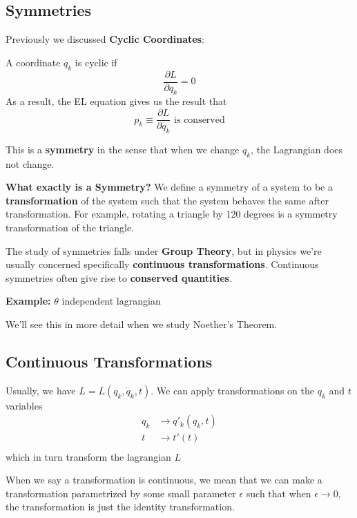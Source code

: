 \documentclass[11pt]{article}
\begin{document}
\vskip 0.5cm
\subsection{Symmetries}
Previously we discussed \textbf{Cyclic Coordinates}: 
\begin{redbox}
  A coordinate $q_{k}$ is cyclic if 
  \[ \frac{\partial L}{\partial q_{k}} = 0\]
  As a result, the EL equation gives us the result that 
  \[ p_{k} \equiv \frac{\partial L}{\partial \dot{q_{k}}} \text{ is conserved} \]
\end{redbox}

\begin{bluebox}
  This is a \textbf{symmetry} in the sense that when we change $q_{k}$, the Lagrangian does not change.
\end{bluebox}

\vskip 0.5cm
\textbf{What exactly is a Symmetry?}
We define a symmetry of a system to be a \textbf{transformation} of the system such that the system behaves the same after transformation. For example, rotating a triangle by $120$ degrees is a symmetry transformation of the triangle.

\vskip 0.5cm
The study of symmetries falls under \textbf{Group Theory}, but in physics we're usually concerned specifically \textbf{continuous transformations}. Continuous symmetries often give rise to \textbf{conserved quantities}.

\begin{redbox}
  \textbf{Example:} $\theta$ independent lagrangian
\end{redbox}

We'll see this in more detail when we study Noether's Theorem.

\vskip 0.5cm
\subsection{Continuous Transformations}
Usually, we have $L = L\left(q_{k}, \dot{q}_{k}, t\right)$. We can apply transformations on the $q_{k}$ and $t$ variables
\begin{align*}
  q_{k} &\rightarrow q'_{k}(q_{k}, t) \\
  t &\rightarrow t'(t) \\
\end{align*}
which in turn transform the lagrangian $L$

\vskip 0.5cm
When we say a transformation is continuous, we mean that we can make a transformation parametrized by some small parameter $\epsilon$ such that when $\epsilon \rightarrow 0$, the transformation is just the identity transformation.
\end{document}
